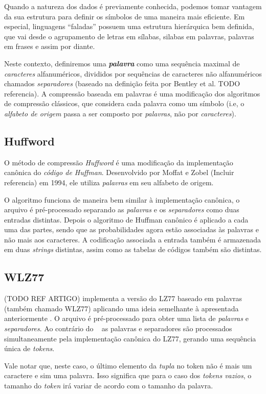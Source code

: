 Quando a natureza dos dados é previamente conhecida, podemos tomar vantagem da sua estrutura para definir os símbolos de uma maneira mais eficiente. 
Em especial, linguagens ``faladas'' possuem uma estrutura hierárquica bem definida, que vai desde o agrupamento de letras em sílabas, silabas em palavras, palavras em frases e assim por diante. 

Neste contexto, definiremos uma \textbf{\emph{palavra}} como uma sequência maximal de \emph{caracteres} alfanuméricos, divididos por sequências de caracteres não alfanuméricos chamados \emph{separadores} (baseado na definição feita por Bentley et al. TODO referencia).
A compressão baseada em palavras é uma modificação dos algoritmos de compressão clássicos, que considera cada palavra como um símbolo (i.e, o \emph{alfabeto de origem} passa a ser composto por \emph{palavras}, não por \emph{caracteres}).

\subsection{Huffword} \label{sub:huffw}
O método de compressão \emph{Huffword} é uma modificação da implementação canônica do \emph{código de Huffman}. 
Desenvolvido por Moffat e Zobel (Incluir referencia) em 1994, ele utiliza \emph{palavras} em seu alfabeto de origem.

O algoritmo funciona de maneira bem similar à implementação canônica, o arquivo é pré-processado separando as \emph{palavras} e os \emph{separadores} como duas entradas distintas.
Depois o algoritmo de Huffman canônico é aplicado a cada uma das partes, sendo que as probabilidades agora estão associadas às palavras e não mais aos caracteres. 
A codificação associada a entrada também é armazenada em duas \emph{strings} distintas, assim como as tabelas de códigos também são distintas.
 
 \subsection{WLZ77}
 (TODO REF ARTIGO) implementa a versão do LZ77 baseado em palavras (também chamado WLZ77) aplicando uma ideia semelhante à apresentada anteriormente . 
 O arquivo é pré-processado para obter uma lista de \emph{palavras} e \emph{separadores}. 
 Ao contrário do ~ as palavras e separadores são processados simultaneamente pela implementação canônica do LZ77, gerando uma sequência única de \emph{tokens}.
 
 Vale notar que, neste caso, o último elemento da \emph{tupla} no token não é mais um caractere e sim uma palavra. Isso significa que para o caso dos \emph{tokens vazios}, o tamanho do \emph{token} irá variar de acordo com o tamanho da palavra.
 
